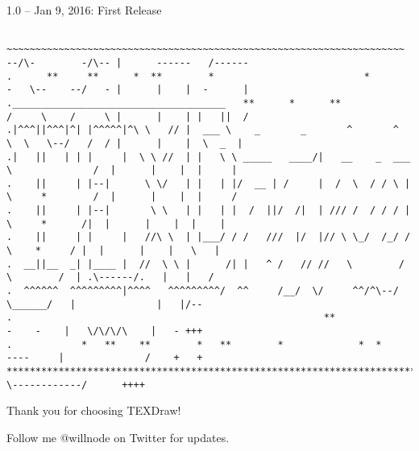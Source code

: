 \documentclass[12pt]{article}
\begin{document}
1.0 – Jan 9, 2016: First Release







\tiny
\begin{verbatim}

~~~~~~~~~~~~~~~~~~~~~~~~~~~~~~~~~~~~~~~~~~~~~~~~~~~~~~~~~~~~~~~~~~~~~ --/\-        -/\-- |      ------   /------
.      **     **      *  **        *                          *       -   \--    --/   - |      |    |  -      |
._____________________________________   **      *      **            /     \    /     \ |      |    | |   ||  /
.|^^^||^^^|^| |^^^^^|^\ \   // |  ___ \    _       _       ^       ^  \  \   \--/   /  / |      |    |  \  _  |
.|   ||   | | |     |  \ \ //  | |   \ \ _____   ____/|   __    _  ___ \              /  |      |    |  |     |
.    ||     | |--|      \ \/   | |   | |/  __ | /     |  /  \  / / \ | \     *        /  |      |    |  |     /
.    ||     | |--|       \ \   | |   | |  /  ||/  /|  | /// /  / / / |  \     *      /|  |      |    |  |    |
.    ||     | |     |   //\ \  | |___/ / /   ///  |/  |// \ \_/  /_/ /   \    *     / |  |      |    |   \   |
.  __||__  _| |____ |  //  \ \ |      /| |   ^ /   // //   \        /     \        /  | .\------/.   |   |   /
.  ^^^^^^  ^^^^^^^^^|^^^^   ^^^^^^^^^/  ^^     /__/  \/     ^^/^\--/       \______/   |              |   |/--
.                                                      **                   -    -    |   \/\/\/\    |   - +++
.            *   **    **        *   **        *             *  *            ----     |              /    +   +
*************************************************************************************  \------------/      ++++
\end{verbatim}
Thank you for choosing TEXDraw!

Follow me @willnode on Twitter for updates.

	
\end{document}
